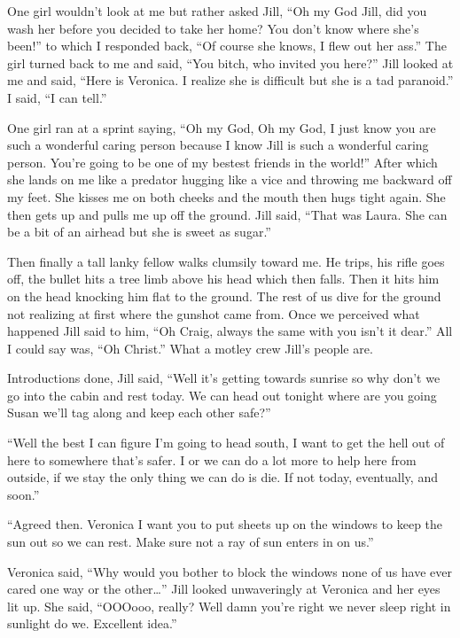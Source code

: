 One girl wouldn't look at me but rather asked Jill, ``Oh my God Jill, did you wash her before you decided to take her home? You don't know where she's been!'' to which I responded back, ``Of course she knows, I flew out her ass.'' The girl turned back to me and said, ``You bitch, who invited you here?'' Jill looked at me and said, ``Here is Veronica. I realize she is difficult but she is a tad paranoid.'' I said, ``I can tell.''

One girl ran at a sprint saying, ``Oh my God, Oh my God, I just know you are such a wonderful caring person because I know Jill is such a wonderful caring person. You're going to be one of my bestest friends in the world!'' After which she lands on me like a predator hugging like a vice and throwing me backward off my feet. She kisses me on both cheeks and the mouth then hugs tight again. She then gets up and pulls me up off the ground. Jill said, ``That was Laura. She can be a bit of an airhead but she is sweet as sugar.''

Then finally a tall lanky fellow walks clumsily toward me. He trips, his rifle goes off, the bullet hits a tree limb above his head which then falls. Then it hits him on the head knocking him flat to the ground. The rest of us dive for the ground not realizing at first where the gunshot came from. Once we perceived what happened Jill said to him, ``Oh Craig, always the same with you isn't it dear.'' All I could say was, ``Oh Christ.'' What a motley crew Jill's people are.

Introductions done, Jill said, ``Well it's getting towards sunrise so why don't we go into the cabin and rest today. We can head out tonight where are you going Susan we'll tag along and keep each other safe?''

``Well the best I can figure I'm going to head south, I want to get the hell out of here to somewhere that's safer. I or we can do a lot more to help here from outside, if we stay the only thing we can do is die. If not today, eventually, and soon.''

``Agreed then. Veronica I want you to put sheets up on the windows to keep the sun out so we can rest. Make sure not a ray of sun enters in on us.''

Veronica said, ``Why would you bother to block the windows none of us have ever cared one way or the other\dots'' Jill looked unwaveringly at Veronica and her eyes lit up. She said, ``OOOooo, really? Well damn you're right we never sleep right in sunlight do we. Excellent idea.''

